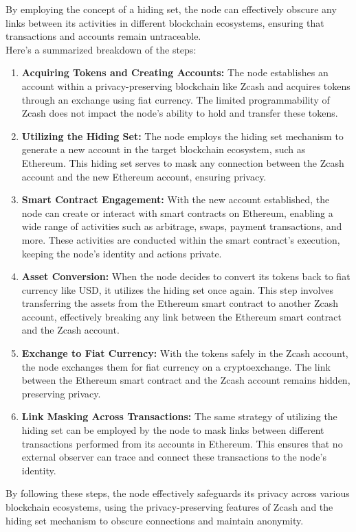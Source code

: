 \documentclass{report}
\begin{document}
By employing the concept of a hiding set, the node can effectively obscure any links between its activities in different blockchain ecosystems, ensuring that transactions and accounts remain untraceable.\\
Here's a summarized breakdown of the steps:
\begin{enumerate}
	\item \textbf{Acquiring Tokens and Creating Accounts:} The node establishes an account within a privacy-preserving blockchain like Zcash and acquires tokens through an exchange using fiat currency. The limited programmability of Zcash does not impact the node's ability to hold and transfer these tokens.
	\item \textbf{Utilizing the Hiding Set:} The node employs the hiding set mechanism to generate a new account in the target blockchain ecosystem, such as Ethereum. This hiding set serves to mask any connection between the Zcash account and the new Ethereum account, ensuring privacy.
	\item \textbf{Smart Contract Engagement:} With the new account established, the node can create or interact with smart contracts on Ethereum, enabling a wide range of activities such as arbitrage, swaps, payment transactions, and more. These activities are conducted within the smart contract's execution, keeping the node's identity and actions private.
	\item \textbf{Asset Conversion:} When the node decides to convert its tokens back to fiat currency like USD, it utilizes the hiding set once again. This step involves transferring the assets from the Ethereum smart contract to another Zcash account, effectively breaking any link between the Ethereum smart contract and the Zcash account.
	\item \textbf{Exchange to Fiat Currency:} With the tokens safely in the Zcash account, the node exchanges them for fiat currency on a cryptoexchange. The link between the Ethereum smart contract and the Zcash account remains hidden, preserving privacy.
	\item \textbf{Link Masking Across Transactions:} The same strategy of utilizing the hiding set can be employed by the node to mask links between different transactions performed from its accounts in Ethereum. This ensures that no external observer can trace and connect these transactions to the node's identity.
\end{enumerate}
By following these steps, the node effectively safeguards its privacy across various blockchain ecosystems, using the privacy-preserving features of Zcash and the hiding set mechanism to obscure connections and maintain anonymity.
\end{document}
